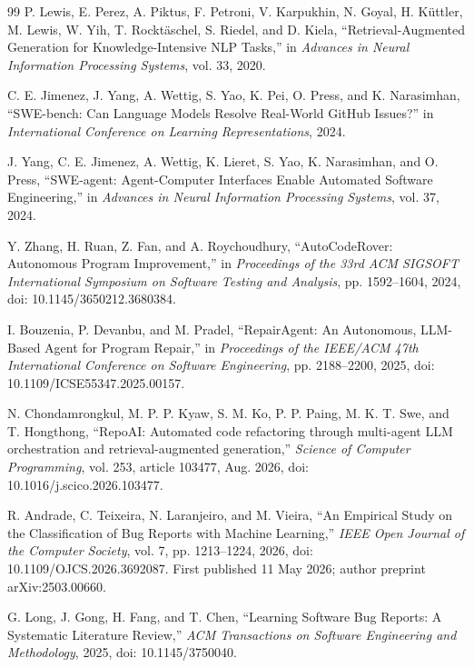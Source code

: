 \documentclass[3p,times,procedia]{elsarticle}
\begin{document}
\begin{thebibliography}{99}
P. Lewis, E. Perez, A. Piktus, F. Petroni, V. Karpukhin, N. Goyal, H. K\"uttler, M. Lewis, W. Yih, T. Rockt\"aschel, S. Riedel, and D. Kiela, ``Retrieval-Augmented Generation for Knowledge-Intensive NLP Tasks,'' in \emph{Advances in Neural Information Processing Systems}, vol. 33, 2020.

C. E. Jimenez, J. Yang, A. Wettig, S. Yao, K. Pei, O. Press, and K. Narasimhan, ``SWE-bench: Can Language Models Resolve Real-World GitHub Issues?'' in \emph{International Conference on Learning Representations}, 2024.

J. Yang, C. E. Jimenez, A. Wettig, K. Lieret, S. Yao, K. Narasimhan, and O. Press, ``SWE-agent: Agent-Computer Interfaces Enable Automated Software Engineering,'' in \emph{Advances in Neural Information Processing Systems}, vol. 37, 2024.

Y. Zhang, H. Ruan, Z. Fan, and A. Roychoudhury, ``AutoCodeRover: Autonomous Program Improvement,'' in \emph{Proceedings of the 33rd ACM SIGSOFT International Symposium on Software Testing and Analysis}, pp. 1592--1604, 2024, doi: 10.1145/3650212.3680384.

I. Bouzenia, P. Devanbu, and M. Pradel, ``RepairAgent: An Autonomous, LLM-Based Agent for Program Repair,'' in \emph{Proceedings of the IEEE/ACM 47th International Conference on Software Engineering}, pp. 2188--2200, 2025, doi: 10.1109/ICSE55347.2025.00157.

N. Chondamrongkul, M. P. P. Kyaw, S. M. Ko, P. P. Paing, M. K. T. Swe, and T. Hongthong, ``RepoAI: Automated code refactoring through multi-agent LLM orchestration and retrieval-augmented generation,'' \emph{Science of Computer Programming}, vol. 253, article 103477, Aug. 2026, doi: 10.1016/j.scico.2026.103477.

R. Andrade, C. Teixeira, N. Laranjeiro, and M. Vieira, ``An Empirical Study on the Classification of Bug Reports with Machine Learning,'' \emph{IEEE Open Journal of the Computer Society}, vol. 7, pp. 1213--1224, 2026, doi: 10.1109/OJCS.2026.3692087. First published 11 May 2026; author preprint arXiv:2503.00660.

G. Long, J. Gong, H. Fang, and T. Chen, ``Learning Software Bug Reports: A Systematic Literature Review,'' \emph{ACM Transactions on Software Engineering and Methodology}, 2025, doi: 10.1145/3750040.


\end{thebibliography}
\end{document}
